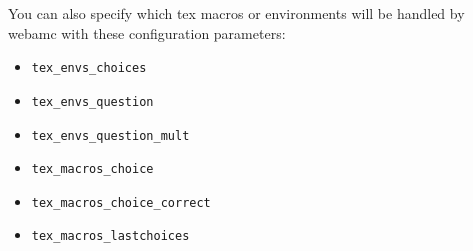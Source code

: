 You can also specify which tex macros or environments will be handled
by webamc with these configuration parameters:
\begin{itemize}
\item \texttt{tex\_envs\_choices}
\item \texttt{tex\_envs\_question}
\item \texttt{tex\_envs\_question\_mult}
\item \texttt{tex\_macros\_choice}
\item \texttt{tex\_macros\_choice\_correct}
\item \texttt{tex\_macros\_lastchoices}
\end{itemize}
